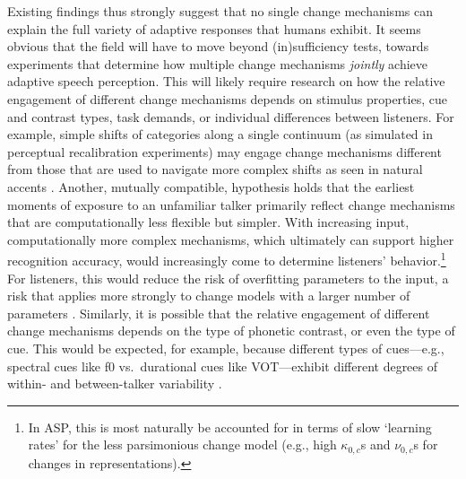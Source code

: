 \documentclass[
  11pt,
  man,floatsintext]{apa6}
\begin{document}
Existing findings thus strongly suggest that no single change mechanisms can explain the full variety of adaptive responses that humans exhibit. It seems obvious that the field will have to move beyond (in)sufficiency tests, towards experiments that determine how multiple change mechanisms \emph{jointly} achieve adaptive speech perception. This will likely require research on how the relative engagement of different change mechanisms depends on stimulus properties, cue and contrast types, task demands, or individual differences between listeners. For example, simple shifts of categories along a single continuum (as simulated in perceptual recalibration experiments) may engage change mechanisms different from those that are used to navigate more complex shifts as seen in natural accents \autocites[for discussion, see][]{bent-baeseberk2021,samuel-kraljic2009,zheng-samuel2020}. Another, mutually compatible, hypothesis holds that the earliest moments of exposure to an unfamiliar talker primarily reflect change mechanisms that are computationally less flexible but simpler. With increasing input, computationally more complex mechanisms, which ultimately can support higher recognition accuracy, would increasingly come to determine listeners' behavior.\footnote{In ASP, this is most naturally be accounted for in terms of slow `learning rates' for the less parsimonious change model (e.g., high \(\kappa_{0,c}\)s and \(\nu_{0,c}\)s for changes in representations).} For listeners, this would reduce the risk of overfitting parameters to the input, a risk that applies more strongly to change models with a larger number of parameters \autocites[for discussion, see][]{apfelbaum-mcmurray2015,kleinschmidt-jaeger2015,toscano-mcmurray2010}. Similarly, it is possible that the relative engagement of different change mechanisms depends on the type of phonetic contrast, or even the type of cue. This would be expected, for example, because different types of cues---e.g., spectral cues like f0 vs.~durational cues like VOT---exhibit different degrees of within- and between-talker variability \autocites[see discussions in][p.~179-180]{kleinschmidt-jaeger2015}{kraljic-samuel2007,xie2021cognition}.
\end{document}
